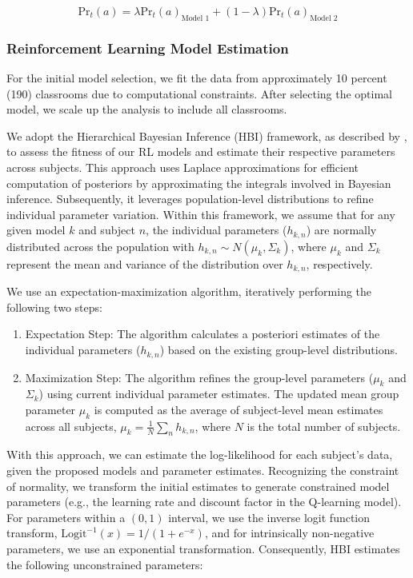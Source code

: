 \documentclass[
  number,
  preprint,
  3p,
  onecolumn]{elsarticle}
\providecommand{\tightlist}{%
  \setlength{\itemsep}{0pt}\setlength{\parskip}{0pt}}\usepackage{longtable,booktabs,array}
\begin{document}
\[
\text{Pr}_t(a) = \lambda \text{Pr}_t(a)_{\text{Model 1}} + (1-\lambda) \text{Pr}_t(a)_{\text{Model 2}}
\]

\subsubsection{Reinforcement Learning Model
Estimation}\label{reinforcement-learning-model-estimation}

For the initial model selection, we fit the data from approximately 10
percent (190) classrooms due to computational constraints. After
selecting the optimal model, we scale up the analysis to include all
classrooms.

We adopt the Hierarchical Bayesian Inference (HBI) framework, as
described by \citep{piray2019a}, to assess the fitness of our RL models
and estimate their respective parameters across subjects. This approach
uses Laplace approximations for efficient computation of posteriors by
approximating the integrals involved in Bayesian inference.
Subsequently, it leverages population-level distributions to refine
individual parameter variation. Within this framework, we assume that
for any given model \(k\) and subject \(n\), the individual parameters
(\(h_{k,n}\)) are normally distributed across the population with
\(h_{k,n} \sim N(\mu_k, \Sigma_k)\), where \(\mu_k\) and \(\Sigma_k\)
represent the mean and variance of the distribution over \(h_{k,n}\),
respectively.

We use an expectation-maximization algorithm, iteratively performing the
following two steps:

\begin{enumerate}
\def\labelenumi{\arabic{enumi}.}
\tightlist
\item
  Expectation Step: The algorithm calculates a posteriori estimates of
  the individual parameters (\(h_{k,n}\)) based on the existing
  group-level distributions.
\item
  Maximization Step: The algorithm refines the group-level parameters
  (\(\mu_k\) and \(\Sigma_k\)) using current individual parameter
  estimates. The updated mean group parameter \(\mu_k\) is computed as
  the average of subject-level mean estimates across all subjects,
  \(\mu_k = \frac{1}{N}\sum_{n}h_{k,n}\), where \(N\) is the total
  number of subjects.
\end{enumerate}

With this approach, we can estimate the log-likelihood for each
subject's data, given the proposed models and parameter estimates.
Recognizing the constraint of normality, we transform the initial
estimates to generate constrained model parameters (e.g., the learning
rate and discount factor in the Q-learning model). For parameters within
a \((0,1)\) interval, we use the inverse logit function transform,
\(\text{Logit}^{-1}(x)=1/(1+e^{-x})\), and for intrinsically
non-negative parameters, we use an exponential transformation.
Consequently, HBI estimates the following unconstrained parameters:
\end{document}
